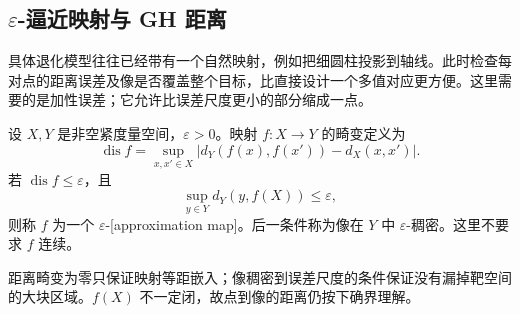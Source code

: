 \subsection{\texorpdfstring{\(\varepsilon\)-逼近映射与 GH 距离}{\GeometryPdfEpsilon{}-逼近映射与 GH 距离}}
\label{g3:subsec:1002:03}

具体退化模型往往已经带有一个自然映射，例如把细圆柱投影到轴线。此时检查每对点的距离误差及像是否覆盖整个目标，比直接设计一个多值对应更方便。这里需要的是加性误差；它允许比误差尺度更小的部分缩成一点。

\begin{definition}\label{g3:def:epsilon-approximation}
	设 \(X,Y\) 是非空紧度量空间，\(\varepsilon>0\)。映射 \(f:X\to Y\) 的畸变定义为
	\[
		\operatorname{dis}f
		=\sup_{x,x'\in X}|d_Y(f(x),f(x'))-d_X(x,x')|.
	\]
	若 \(\operatorname{dis}f\le\varepsilon\)，且
	\[
		\sup_{y\in Y}d_Y(y,f(X))\le\varepsilon,
	\]
	则称 \(f\) 为一个 \(\varepsilon\)-[approximation map]。后一条件称为像在 \(Y\) 中 \(\varepsilon\)-稠密。这里不要求 \(f\) 连续。
\end{definition}

距离畸变为零只保证映射等距嵌入；像稠密到误差尺度的条件保证没有漏掉靶空间的大块区域。\(f(X)\) 不一定闭，故点到像的距离仍按下确界理解。

